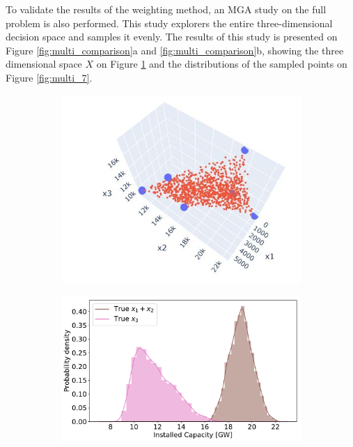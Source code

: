 To validate the results of the weighting method, an MGA study on the full problem is also performed. This study explorers the entire three-dimensional decision space and samples it evenly.
The results of this study is presented on Figure \ref{fig:multi_comparison}a and \ref{fig:multi_comparison}b, showing the three dimensional space $X$ on Figure \ref{fig:multi_6} and the distributions of the sampled points on Figure \ref{fig:multi_7}.  

\begin{figure}[h]\centering
	\begin{subfigure}{.5\textwidth} \centering
		\includegraphics[width=1.\textwidth]{./Images/multi_6}
		\caption{}
		\label{fig:multi_6}
	\end{subfigure}%
	\begin{subfigure}{.5\textwidth} \centering
		\includegraphics[width=1.\textwidth]{./Images/multi_7}

\end{subfigure}
\end{figure}
